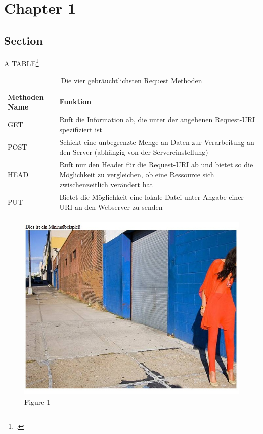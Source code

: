 \chapter{Chapter 1}


\section{Section}

A TABLE\footcite{APPLE1:ONLINE}

\begin{table}[h]
\centering


\begin{tabularx}{\textwidth}{|lX|}
\hline
\rowcolor{gray!50} \textbf{Methoden Name} & \textbf{Funktion} \\ 
GET  & Ruft die Information ab, die unter der angebenen Request-\ac{URI} spezifiziert ist \\ 
POST  & Schickt eine unbegrenzte Menge an Daten zur Verarbeitung an den Server (abhängig von der Servereinstellung) \\ \hline
HEAD & Ruft nur den Header für die Request-\ac{URI} ab und bietet so die Möglichkeit zu vergleichen, ob eine Ressource sich zwischenzeitlich verändert hat \\ 
PUT & Bietet die Möglichkeit eine lokale Datei unter Angabe einer \ac{URI} an den Webserver zu senden \\ 
\hline
\end{tabularx}
\caption{Die vier gebräuchtlichsten Request Methoden}
\label{tab:http2}
\end{table}


\lstset{language=PHP}


\begin{figure}[h]
\centering
\includegraphics[width=\textwidth]{images/abt1_webseite.jpg}
\caption{Figure 1}
\end{figure}


